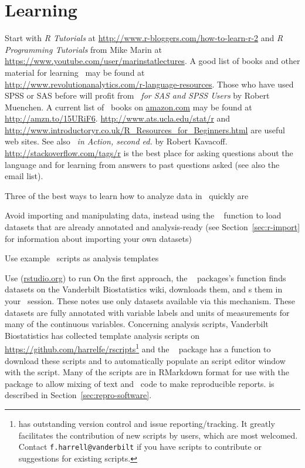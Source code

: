\section{Learning \R}
Start with \emph{R Tutorials} at \url{http://www.r-bloggers.com/how-to-learn-r-2} and \emph{R Programming Tutorials} from Mike Marin at
\url{https://www.youtube.com/user/marinstatlectures}.
A good list of books and other material for learning \R\ may be found at\\
\url{http://www.revolutionanalytics.com/r-language-resources}.  Those
who have used SPSS or SAS before will profit from \emph{\R\ for SAS
  and SPSS Users} by Robert Muenchen.  A current list of \R\ books on
\url{amazon.com} may be found at \url{http://amzn.to/15URiF6}.
\url{http://www.ats.ucla.edu/stat/r} and
\url{http://www.introductoryr.co.uk/R_Resources_for_Beginners.html}
are useful web sites. See also \emph{\R\ in Action, second ed.} by Robert 
Kavacoff.
\url{http://stackoverflow.com/tags/r} is the best place for asking
questions about the language and for learning from answers to past questions
asked (see also the  email list).

Three of the best ways to learn how to analyze data in \R\ quickly are
\be
\item Avoid importing and manipulating data, instead using the \R\
   function to load datasets that are already annotated and
  analysis-ready (see Section~\ref{sec:r-import} for information about
  importing your own datasets)
\item Use example \R\ scripts as analysis templates
\item Use  (\url{rstudio.org}) to run \R
\ee
On the first approach, the \R\  packages's 
function finds datasets on the Vanderbilt Biostatistics 
wiki, downloads them, and \co{load()}s them in your \R\ session.
These notes use only datasets available via this mechanism.  These
datasets are fully annotated with variable labels and units of
measurements for many of the continuous variables.
Concerning analysis scripts, Vanderbilt Biostatistics has collected
template analysis scripts on
\url{https://github.com/harrelfe/rscripts}\footnote{ has
  outstanding version control and issue reporting/tracking.  It
  greatly facilitates the contribution of new scripts by users, which
  are most welcomed.  Contact \texttt{f.harrell@vanderbilt} if you
  have scripts to contribute or suggestions for existing scripts.} and
the \R\ \co{Hmisc} package has a function \co{getRs} to download these
scripts and to automatically populate an 
 script editor window with the script.
Many of the scripts are in RMarkdown format for use with the \R\
 package to allow mixing of text and \R\ code to make
reproducible reports.  \co{knitr} is described in 
Section~\ref{sec:repro-software}.

